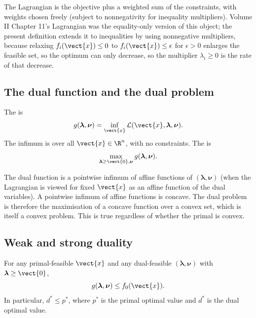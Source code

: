 The Lagrangian is the objective plus a weighted sum of the
constraints, with weights chosen freely (subject to nonnegativity
for inequality multipliers). Volume II Chapter 11's Lagrangian was
the equality-only version of this object; the present definition
extends it to inequalities by using nonnegative multipliers,
because relaxing $f_{i}(\vect{x}) \leq 0$ to $f_{i}(\vect{x}) \leq
\epsilon$ for $\epsilon > 0$ enlarges the feasible set, so the
optimum can only decrease, so the multiplier $\lambda_{i} \geq 0$
is the rate of that decrease.

\subsection{The dual function and the dual problem}

\begin{definition}
The  is
\[
g(\boldsymbol{\lambda}, \boldsymbol{\nu}) =
\inf_{\vect{x}} \mathcal{L}(\vect{x}, \boldsymbol{\lambda},
\boldsymbol{\nu}).
\]
The infimum is over all $\vect{x} \in \R^{n}$, with no
constraints. The  is
\[
\max_{\boldsymbol{\lambda} \geq \vect{0}, \boldsymbol{\nu}}
g(\boldsymbol{\lambda}, \boldsymbol{\nu}).
\]
\end{definition}

The dual function is a pointwise infimum of affine functions of
$(\boldsymbol{\lambda}, \boldsymbol{\nu})$ (when the Lagrangian is
viewed for fixed $\vect{x}$ as an affine function of the dual
variables). A pointwise infimum of affine functions is concave.
The dual problem is therefore the maximisation of a concave
function over a convex set, which is itself a convex problem.
This is true regardless of whether the primal is convex.

\subsection{Weak and strong duality}

\begin{theorem}
For any primal-feasible $\vect{x}$ and any dual-feasible
$(\boldsymbol{\lambda}, \boldsymbol{\nu})$ with
$\boldsymbol{\lambda} \geq \vect{0}$,
\[
g(\boldsymbol{\lambda}, \boldsymbol{\nu}) \leq f_{0}(\vect{x}).
\]
In particular, $d^{*} \leq p^{*}$, where $p^{*}$ is the primal
optimal value and $d^{*}$ is the dual optimal value.
\end{theorem}

